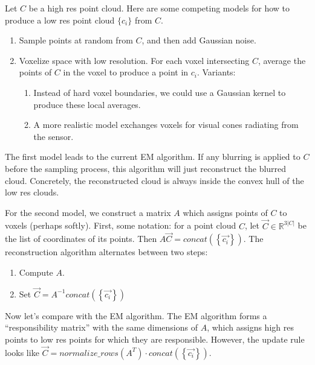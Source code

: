 \documentclass[12pt]{article}
\newcommand{\R}{\mathbb R}
\newcommand{\seq}[1]{\{#1 _i\}}
\newcommand{\set}[1]{\left\{#1\right\}}
\newcommand{\abs}[1]{\left| #1 \right|}
\newcommand{\inv}{^{-1}}
\begin{document}
Let $C$ be a high res point cloud. Here are some competing models for how to produce a low res point cloud $\seq c$ from $C$.
\begin{enumerate}
	\item Sample points at random from $C$, and then add Gaussian noise.
	\item Voxelize space with low resolution. For each voxel intersecting $C$, average the points of $C$ in the voxel to produce a point in $c_i$. Variants:
		\begin{enumerate}
			\item Instead of hard voxel boundaries, we could use a Gaussian kernel to produce these local averages.
			\item A more realistic model exchanges voxels for visual cones radiating from the sensor.
		\end{enumerate}
\end{enumerate}
The first model leads to the current EM algorithm. If any blurring is applied to $C$ before the sampling process, this algorithm will just reconstruct the blurred cloud. Concretely, the reconstructed cloud is always inside the convex hull of the low res clouds.

For the second model, we construct a matrix $A$ which assigns points of $C$ to voxels (perhaps softly). First, some notation: for a point cloud $C$, let $\vec{C} \in \R^{3\abs{C}}$ be the list of coordinates of its points. Then $A\vec{C}=concat(\set{\vec{c_i}})$. The reconstruction algorithm alternates between two steps:
\begin{enumerate}
	\item Compute $A$.
	\item Set $\vec{C}=A\inv concat(\set{\vec{c_i}})$
\end{enumerate}
Now let's compare with the EM algorithm. The EM algorithm forms a ``responsibility matrix'' with the same dimensions of $A$, which assigns high res points to low res points for which they are responsible. However, the update rule looks like $\vec{C}=normalize\_rows(A^T)\cdot concat(\set{\vec{c_i}})$.
\end{document}
